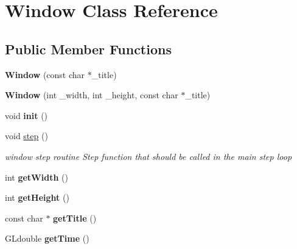 \hypertarget{class_window}{}\section{Window Class Reference}
\label{class_window}
\subsection*{Public Member Functions}
\begin{DoxyCompactItemize}
\item 
\hypertarget{class_window_aacf1d99ff9bda29482200ca045db1cc5}{}{\bfseries Window} (const char $\ast$\+\_\+title)\label{class_window_aacf1d99ff9bda29482200ca045db1cc5}

\item 
\hypertarget{class_window_a280d6e2bf5001e20d072561a3bc1a476}{}{\bfseries Window} (int \+\_\+width, int \+\_\+height, const char $\ast$\+\_\+title)\label{class_window_a280d6e2bf5001e20d072561a3bc1a476}

\item 
\hypertarget{class_window_a4d8c7f316ef9e8a4488d00c430957c16}{}void {\bfseries init} ()\label{class_window_a4d8c7f316ef9e8a4488d00c430957c16}

\item 
\hypertarget{class_window_ab7bd50373f43933a9ee1fcdff63c552f}{}void \hyperlink{class_window_ab7bd50373f43933a9ee1fcdff63c552f}{step} ()\label{class_window_ab7bd50373f43933a9ee1fcdff63c552f}

\begin{DoxyCompactList}\small\item\em window step routine Step function that should be called in the main step loop \end{DoxyCompactList}\item 
\hypertarget{class_window_a2d459fe21a48b6a41834a32a6c84fe2e}{}int {\bfseries get\+Width} ()\label{class_window_a2d459fe21a48b6a41834a32a6c84fe2e}

\item 
\hypertarget{class_window_a02acaaf02d8b63d4bd74d99482fe3a78}{}int {\bfseries get\+Height} ()\label{class_window_a02acaaf02d8b63d4bd74d99482fe3a78}

\item 
\hypertarget{class_window_aedbcaf1e712cd9e24e8bd4e44f6cf666}{}const char $\ast$ {\bfseries get\+Title} ()\label{class_window_aedbcaf1e712cd9e24e8bd4e44f6cf666}

\item 
\hypertarget{class_window_af42804928c7fdc223ae86097ad006e22}{}G\+Ldouble {\bfseries get\+Time} ()\label{class_window_af42804928c7fdc223ae86097ad006e22}


\end{DoxyCompactItemize}

